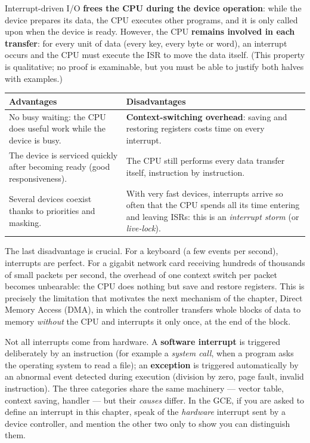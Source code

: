 \documentclass[11pt]{article}
\newcommand{\cle}[1]{{\popxbold\color{popdark}#1}}
\begin{document}
\begin{propriete}
Interrupt-driven I/O \textbf{frees the CPU during the device operation}: while the device prepares its data, the CPU executes other programs, and it is only called upon when the device is ready. However, the CPU \textbf{remains involved in each transfer}: for every unit of data (every key, every byte or word), an interrupt occurs and the CPU must execute the ISR to move the data itself. (This property is qualitative; no proof is examinable, but you must be able to justify both halves with examples.)
\end{propriete}

\begin{center}
\begin{tabularx}{\linewidth}{|X|X|}
\hline
\rowcolor{popblueL} \textbf{Advantages} & \textbf{Disadvantages} \\
\hline
No busy waiting: the CPU does useful work while the device is busy. & \textbf{Context-switching overhead}: saving and restoring registers costs time on every interrupt. \\
\hline
The device is serviced quickly after becoming ready (good responsiveness). & The CPU still performs every data transfer itself, instruction by instruction. \\
\hline
Several devices coexist thanks to priorities and masking. & With very fast devices, interrupts arrive so often that the CPU spends all its time entering and leaving ISRs: this is an \emph{interrupt storm} (or \emph{live-lock}). \\
\hline
\end{tabularx}
\end{center}

The last disadvantage is crucial. For a keyboard (a few events per second), interrupts are perfect. For a gigabit network card receiving hundreds of thousands of small packets per second, the overhead of one context switch per packet becomes unbearable: the CPU does nothing but save and restore registers. This is precisely the limitation that motivates the next mechanism of the chapter, \cle{Direct Memory Access} (DMA), in which the controller transfers whole blocks of data to memory \emph{without} the CPU and interrupts it only once, at the end of the block.

\begin{savaistu}
Not all interrupts come from hardware. A \textbf{software interrupt} is triggered deliberately by an instruction (for example a \emph{system call}, when a program asks the operating system to read a file); an \textbf{exception} is triggered automatically by an abnormal event detected during execution (division by zero, page fault, invalid instruction). The three categories share the same machinery --- vector table, context saving, handler --- but their \emph{causes} differ. In the GCE, if you are asked to define an interrupt in this chapter, speak of the \emph{hardware} interrupt sent by a device controller, and mention the other two only to show you can distinguish them.
\end{savaistu}
\end{document}
